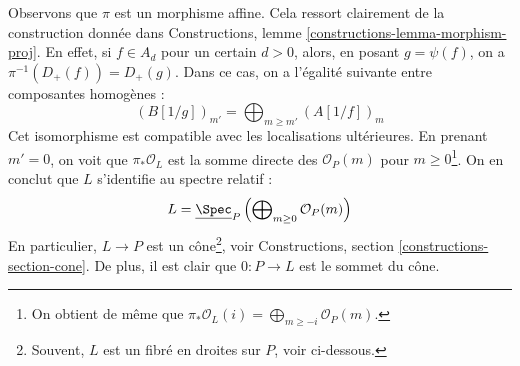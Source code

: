 \medskip\noindent
Observons que $\pi$ est un morphisme affine. Cela ressort clairement de la construction
donnée dans Constructions, lemme \ref{constructions-lemma-morphism-proj}. En effet, si
$f \in A_d$ pour un certain $d > 0$, alors, en
posant $g = \psi(f)$, on a $\pi^{-1}(D_+(f)) = D_+(g)$.
Dans ce cas, on a l'égalité suivante entre composantes homogènes :
$$
(B[1/g])_{m'} = \bigoplus\nolimits_{m \geq m'} (A[1/f])_m
$$
Cet isomorphisme est compatible avec les localisations ultérieures.
En prenant $m' = 0$, on voit que $\pi_*\mathcal{O}_L$ est la
somme directe des $\mathcal{O}_P(m)$ pour $m \geq 0$\footnote{On obtient de même
que $\pi_*\mathcal{O}_L(i) = \bigoplus_{m \geq -i} \mathcal{O}_P(m)$.}.
On en conclut que $L$ s'identifie au spectre relatif :
$$
L = \underline{\Spec}_P
\left(
\bigoplus\nolimits_{m \geq 0} \mathcal{O}_P(m)
\right)
$$
En particulier, $L \to P$ est un cône\footnote{Souvent, $L$ est un fibré en droites
sur $P$, voir ci-dessous.}, voir
Constructions, section \ref{constructions-section-cone}.
De plus, il est clair que $0 : P \to L$ est le sommet du cône.

